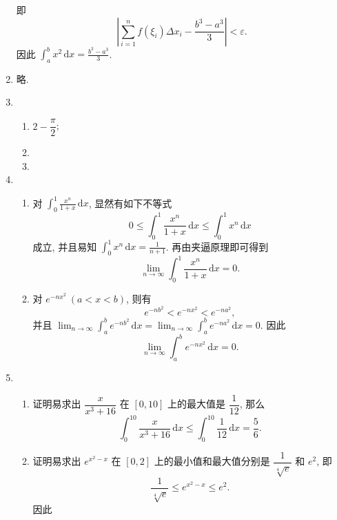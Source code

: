 \documentclass[a4paper, 11pt]{ctexart}
\newcommand{\dif}{\mathrm{d}}
\begin{document}
\begin{enumerate}
\[        \]
        即
        \[
            \left|\sum_{i=1}^nf(\xi_i)\Delta x_i - \frac{b^3-a^3}{3}\right| < \varepsilon.    
        \]
        因此 $\displaystyle{\int_a^b x^2}\,\dif x = \frac{b^3-a^3}{3}$.
    \item %
        略.
    \item %
        \begin{enumerate}[(1)]
            \item %
                $2-\dfrac\pi2$;
            \item %
            \item %
        \end{enumerate}
    \item %
        \begin{enumerate}[(1)]
            \item %
                对 $\displaystyle{\int_0^1\frac{x^n}{1+x}\,\dif x}$, 显然有如下不等式
                \[
                    0 \leqslant \int_0^1\frac{x^n}{1+x}\,\dif x \leqslant \int_0^1x^n\,\dif x   
                \]
                成立, 并且易知 $\displaystyle{\int_0^1x^n\,\dif x = \frac{1}{n+1}}$. 再由夹逼原理即可得到
                \[
                    \lim_{n\to\infty}\int_0^1\frac{x^n}{1+x}\,\dif x = 0.   
                \]
            \item %
                对 $e^{-nx^2}\ (a<x<b)$, 则有 \[
                    e^{-nb^2} < e^{-nx^2} < e^{-na^2},
                \] 并且 $\displaystyle{
                    \lim_{n\to\infty}\int_a^b e^{-nb^2}\,\dif x = \lim_{n\to\infty}\int_a^b e^{-na^2}\,\dif x = 0
                }$. 因此
                \[
                    \lim_{n\to\infty}\int_a^b e^{-nx^2}\,\dif x = 0.  
                \]
        \end{enumerate}
    \item %
        \begin{enumerate}[(1)]
            \item %
                {\heiti 证明}\quad 易求出 $\dfrac{x}{x^3 + 16}$ 在 $[0, 10]$ 上的最大值是 $\dfrac{1}{12}$, 那么
                \[
                    \int_0^{10}\frac{x}{x^3+16}\,\dif x \leqslant \int_0^{10}\frac{1}{12}\,\dif x = \frac56.    
                \]
            \item %
                {\heiti 证明}\quad 易求出 $e^{x^2-x}$ 在 $[0, 2]$ 上的最小值和最大值分别是 $\dfrac{1}{\sqrt[4]{e}}$ 和 $e^2$, 即
                \[
                    \frac{1}{\sqrt[4]{e}} \leqslant e^{x^2-x} \leqslant e^2.  
                \] 因此

\end{enumerate}
\end{enumerate}
\end{document}

